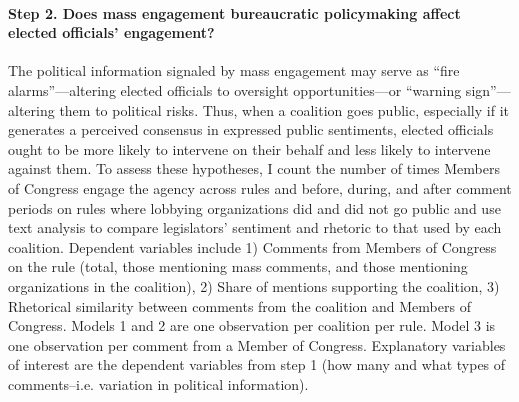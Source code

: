 \paragraph{Step 2. Does mass engagement bureaucratic policymaking affect elected officials' engagement?} The political information signaled by mass engagement may serve as ``fire alarms''---altering elected officials to oversight opportunities---or ``warning sign''---altering them to political risks.
Thus, when a coalition goes public, especially if it generates a perceived consensus in expressed public sentiments, elected officials ought to be more likely to intervene on their behalf and less likely to intervene against them.  
To assess these hypotheses, I count the number of times Members of Congress engage the agency across rules and before, during, and after comment periods on rules where lobbying organizations did and did not go public and use text analysis to compare legislators' sentiment and rhetoric to that used by each coalition.
Dependent variables include 1) Comments from Members of Congress on the rule (total, those mentioning mass comments, and those mentioning organizations in the coalition), %
2) Share of mentions supporting the coalition, %
3) Rhetorical similarity between comments from the coalition and Members of Congress. 
Models 1 and 2 are one observation per coalition per rule. Model 3 is one observation per comment from a Member of Congress. Explanatory variables of interest are the dependent variables from step 1 (how many and what types of comments--i.e. variation in political information).%

